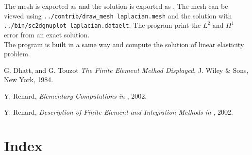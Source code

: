 \documentclass[11pt,a4paper]{article}
\begin{document}
The mesh is exported as  and the solution is exported as . The mesh can be viewed using {\tt ../contrib/draw\_mesh laplacian.mesh} and the solution with {\tt ../bin/sc2dgnuplot laplacian.dataelt}. The program print the $L^2$ and $H^1$ error from an exact solution.\\[0.5cm]
The program  is built in a same way and compute the solution of linear elasticity problem.

\begin{thebibliography}{99}
% 
% 
% 
  {\texonly{\sc} G. Dhatt, and  G. Touzot}
  {\it The Finite Element Method Displayed}, 
 J. Wiley \& Sons,  New York, 1984.

  Y. {\texonly{\sc} Renard},
  {\it Elementary Computations in \gf }, 2002.

  Y. {\texonly{\sc} Renard},
  {\it Description of Finite Element and Integration Methods in \gf }, 2002.

\end{thebibliography}

\W \section*{Index}
\texorhtml{\printindex}{\label{gfmindex}\htmlprintindex}
\end{document}
